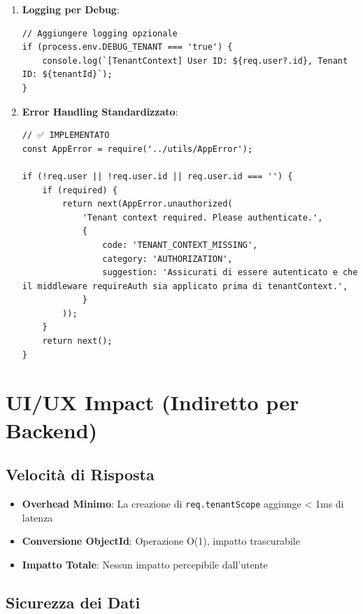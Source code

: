 \documentclass[11pt,a4paper]{article}
\begin{document}
\begin{enumerate}
    \item \textbf{Logging per Debug}:
    \begin{lstlisting}
// Aggiungere logging opzionale
if (process.env.DEBUG_TENANT === 'true') {
    console.log(`[TenantContext] User ID: ${req.user?.id}, Tenant ID: ${tenantId}`);
}
    \end{lstlisting}
    
    \item \textbf{Error Handling Standardizzato}:
    \begin{lstlisting}
// ✅ IMPLEMENTATO
const AppError = require('../utils/AppError');

if (!req.user || !req.user.id || req.user.id === '') {
    if (required) {
        return next(AppError.unauthorized(
            'Tenant context required. Please authenticate.',
            {
                code: 'TENANT_CONTEXT_MISSING',
                category: 'AUTHORIZATION',
                suggestion: 'Assicurati di essere autenticato e che il middleware requireAuth sia applicato prima di tenantContext.',
            }
        ));
    }
    return next();
}
    \end{lstlisting}
\end{enumerate}

\section{UI/UX Impact (Indiretto per Backend)}

\subsection{Velocità di Risposta}

\begin{itemize}
    \item \textbf{Overhead Minimo}: La creazione di \texttt{req.tenantScope} aggiunge < 1ms di latenza
    \item \textbf{Conversione ObjectId}: Operazione O(1), impatto trascurabile
    \item \textbf{Impatto Totale}: Nessun impatto percepibile dall'utente
\end{itemize}

\subsection{Sicurezza dei Dati}
\end{document}
